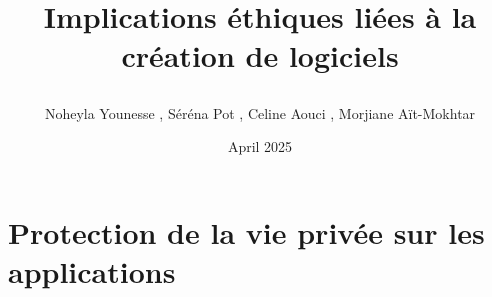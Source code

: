 \documentclass{article}
\title{Implications éthiques liées à la création de logiciels

}
\author{Noheyla Younesse , Séréna Pot , Celine Aouci , Morjiane Aït-Mokhtar}
\date{April 2025}
\begin{document}
\maketitle

\section{Protection de la vie privée sur les applications}
\end{document}
